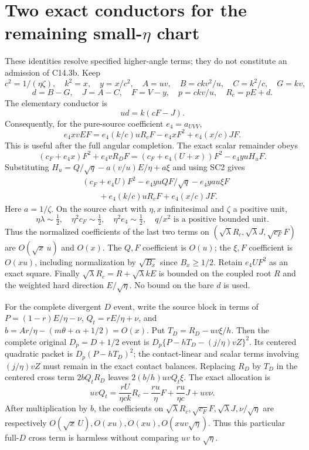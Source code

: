 \section{Two exact conductors for the remaining small-$\eta$ chart}
These identities resolve specified higher-angle terms; they do not
constitute an admission of C14.3b. Keep
\[
 c^2=1/(\eta\zeta),\quad k^2=x,\quad y=x/c^2,\quad
 A=uv,\quad B=ckv^2/u,\quad C=k^2/c,\quad G=kv,
\]
\[
 d=B-G,\quad J=A-C,\quad F=V-y,\quad
 p=ckv/u,\quad R_c=pE+d.
\]
The elementary conductor is
\[
                         ud=k(cF-J).                 \tag{SC1}
\]
Consequently, for the pure-source coefficient $e_4=a_{UVV}$,
\[
 e_4xvEF=e_4(k/c)uR_cF-e_4xF^2+e_4(x/c)JF.           \tag{SC2}
\]
This is useful after the full angular completion. The exact scalar
remainder obeys
\[
 (c_F+e_4x)F^2+e_4vR_DF
       =(c_F+e_4(U+x))F^2-e_4yuH_uF.
\]
Substituting
$H_u=Q/\sqrt q-a(v/u)E/\eta+a\xi$ and using SC2 gives
\[
\begin{split}
 &(c_F+e_4U)F^2-e_4yuQF/\sqrt q-e_4ya u\xi F\\
 &\qquad+e_4(k/c)uR_cF+e_4(x/c)JF.
\end{split}                                             \tag{SC3}
\]
Here $a=1/\zeta$. On the source chart with $\eta,x$ infinitesimal
and $\zeta$ a positive unit,
\[
 \eta\lambda\sim\tfrac12,\quad
 \eta^2c_F\sim\tfrac12,\quad \eta^2e_4\sim\tfrac12,
 \quad q/x^2\text{ is a positive bounded unit}.
\]
Thus the normalized coefficients of the last two terms on
$(\sqrt\lambda R_c,\sqrt\lambda J,\sqrt{c_F}F)$ are
$O(\sqrt x\,u)$ and $O(x)$. The $Q,F$ coefficient is $O(u)$;
the $\xi,F$ coefficient is $O(xu)$, including normalization by
$\sqrt{B_x}$ since $B_x\ge1/2$. Retain $e_4UF^2$ as an exact
square. Finally $\sqrt\lambda R_c=R+\sqrt\lambda kE$ is
bounded on the coupled root $R$ and the weighted hard direction
$E/\sqrt\eta$. No bound on the bare $d$ is used.

For the complete divergent $D$ event, write the source block in
terms of $P=(1-r)E/\eta-\nu$, $Q_t=rE/\eta+\nu$, and
$b=Ar/\eta-(m\theta+\alpha+1/2)=O(x)$. Put
$T_D=R_D-uv\xi/h$. Then the complete original $D_p=D+1/2$ event is
$D_p\{P-hT_D-(j/\eta)vZ\}^2$. Its centered quadratic packet is
$D_p(P-hT_D)^2$; the contact-linear and scalar terms involving
$(j/\eta)vZ$ must remain in the exact contact balances. Replacing
$R_D$ by $T_D$ in the centered cross term $2bQ_tR_D$ leaves $2(b/h)uvQ_t\xi$. The exact
allocation is
\[
 uvQ_t=\frac{rU}{\eta ck}R_c-\frac{ru}{\eta}F
                    +\frac{ru}{\eta c}J+uv\nu.       \tag{SC4}
\]
After multiplication by $b$, the coefficients on
$\sqrt\lambda R_c,\sqrt{c_F}F,\sqrt\lambda J,\nu/\sqrt\eta$
are respectively $O(\sqrt x\,U),O(xu),O(xu),O(xuv\sqrt\eta)$.
Thus this particular full-$D$ cross term is harmless without comparing
$uv$ to $\sqrt\eta$.

